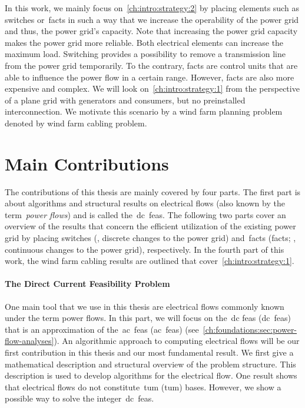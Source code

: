 In this work, we mainly focus on~\cref{ch:intro:strategy:2} by placing elements
such as switches or~\gls{facts} in such a way that we increase the operability
of the power grid and thus, the power grid's capacity. Note that increasing the
power grid capacity makes the power grid more reliable. Both electrical elements
can increase the maximum load. Switching provides a possibility to remove a
transmission line from the power grid temporarily. To the contrary, \gls{facts}
are control units that are able to influence the power flow in a certain range.
However,
\gls{facts} are also more expensive and complex. We will look
on~\cref{ch:intro:strategy:1} from the perspective of a plane grid with
generators and consumers, but no preinstalled interconnection. We motivate this
scenario by a wind farm planning problem denoted by wind farm cabling problem.
% 
\section{Main Contributions}
\label{ch:intro:sec:contribution}
% 
The contributions of this thesis are mainly covered by four parts. The first
part is about algorithms and structural results on electrical flows (also known
by the term~\emph{power flows}) and is called the~\acrlong{dc}~\acrlong{feas}.
The following two parts cover an overview of the results that concern the
efficient utilization of the existing power grid by placing switches (\ie,
discrete changes to the power grid) and~\acrlong{facts} (\gls{facts}; \ie,
continuous changes to the power grid), respectively. In the fourth part of this
work, the wind farm cabling results are outlined that
cover~\cref{ch:intro:strategy:1}.
%
\paragraph{The Direct Current Feasibility Problem}
% 
One main tool that we use in this thesis are electrical flows commonly known
under the term power flows. In this part, we will focus on the~\acrlong{dc}
\acrlong{feas} (\gls{dc}~\gls{feas}) that is an approximation of
the~\acrlong{ac}~\acrlong{feas} (\gls{ac}~\gls{feas})
(see~\cref{ch:foundations:sec:power-flow-analyses}). An algorithmic approach to
computing electrical flows will be our first contribution in this thesis and our
most fundamental result. We first give a mathematical description and structural
overview of the problem structure. This description is used to develop
algorithms for the electrical flow. One result shows that electrical flows do
not constitute~\acrlong{tum} (\gls{tum}) bases. However, we show a possible way
to solve the integer~\gls{dc}~\gls{feas}.

